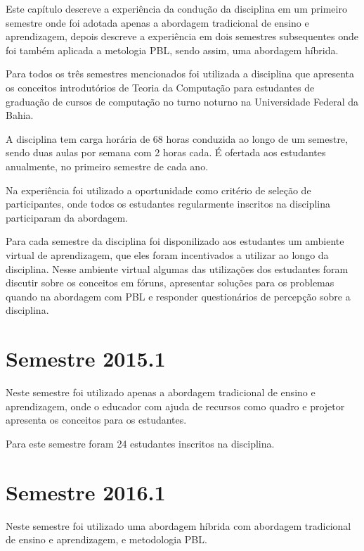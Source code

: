 \label{cap-experiencia}
\acresetall

Este capítulo descreve a experiência da condução da disciplina em um primeiro
semestre onde foi adotada apenas a abordagem tradicional de ensino e aprendizagem,
depois descreve a experiência em dois semestres subsequentes onde foi também aplicada a metologia PBL,
sendo assim, uma abordagem híbrida.

Para todos os três semestres mencionados foi utilizada a disciplina que apresenta os
conceitos introdutórios de Teoria da Computação para estudantes de graduação de cursos de computação
no turno noturno na Universidade Federal da Bahia.

A disciplina tem carga horária de 68 horas conduzida ao longo de um semestre, sendo duas
aulas por semana com 2 horas cada.
É ofertada aos estudantes anualmente, no primeiro semestre de cada ano.

Na experiência foi utilizado a oportunidade como critério de seleção de participantes, onde todos os
estudantes regularmente inscritos na disciplina participaram da abordagem.

Para cada semestre da disciplina foi disponilizado aos estudantes um ambiente virtual de aprendizagem,
que eles foram incentivados a utilizar ao longo da disciplina.
Nesse ambiente virtual algumas das utilizações dos estudantes foram discutir sobre os conceitos
em fóruns, apresentar soluções para os problemas quando na abordagem com PBL e responder
questionários de percepção sobre a disciplina.

\section{Semestre 2015.1}
Neste semestre foi utilizado apenas a abordagem tradicional de ensino e aprendizagem, onde o educador
com ajuda de recursos como quadro e projetor apresenta os conceitos para os estudantes.

Para este semestre foram 24 estudantes inscritos na disciplina.


\section{Semestre 2016.1}

Neste semestre foi utilizado uma abordagem híbrida com abordagem tradicional de ensino
e aprendizagem, e metodologia PBL.


